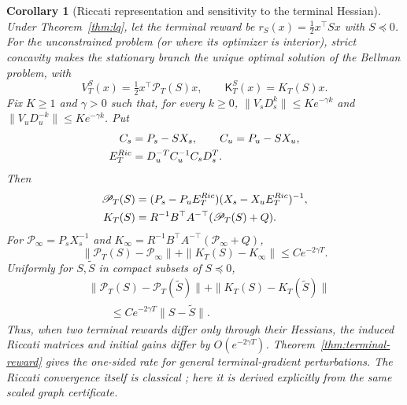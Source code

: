 \documentclass[twocolumn,nameyear,amsthm]{autart}
\newcommand{\Kfb}{\mathsf K}
\numberwithin{equation}{section}
\newtheorem{corollary}[theorem]{Corollary}
\begin{document}
\begin{corollary}[Riccati representation and sensitivity to the terminal Hessian]
\label{cor:riccati-rate}
Under Theorem~\ref{thm:lq}, let the terminal reward be
$r_S(x)=\tfrac12x^\top Sx$ with $S\preceq0$.  For the unconstrained problem
(or where its optimizer is interior), strict concavity makes the stationary
branch the unique optimal solution of the Bellman problem, with
\[
 V_T^S(x)=\tfrac12x^\top\mathscr P_T(S)x,\qquad
 \Kfb_T^S(x)=K_T(S)x.
\]
Fix $K\ge1$ and $\gamma>0$ such that, for every $k\ge0$,
$\|V_sD_s^k\|\le Ke^{-\gamma k}$ and
$\|V_uD_u^{-k}\|\le Ke^{-\gamma k}$.
Put
\begin{equation}\label{eq:lq-mobius-data}
 \begin{aligned}
 C_s&=P_s-SX_s,\qquad C_u=P_u-SX_u,\\
 E_T^{\rm Ric}&=D_u^{-T}C_u^{-1}C_sD_s^T .
 \end{aligned}
\end{equation}
Then
\begin{align}
 \mathscr P_T(S)&=(P_s-P_uE_T^{\rm Ric})(X_s-X_uE_T^{\rm Ric})^{-1},
 \label{eq:lq-mobius}\\
 K_T(S)&=R^{-1}B^\top A^{-\top}(\mathscr P_T(S)+Q).
 \label{eq:lq-first-gain}
\end{align}
For $\mathscr P_\infty=P_sX_s^{-1}$ and
$K_\infty=R^{-1}B^\top A^{-\top}(\mathscr P_\infty+Q)$,
\begin{equation}\label{eq:lq-doubled-rate}
 \|\mathscr P_T(S)-\mathscr P_\infty\|+
 \|K_T(S)-K_\infty\|\le Ce^{-2\gamma T}.
\end{equation}
Uniformly for $S,\widetilde S$ in compact subsets of $S\preceq0$,
\begin{align}
 &\|\mathscr P_T(S)-\mathscr P_T(\widetilde S)\|
 +\|K_T(S)-K_T(\widetilde S)\|\nonumber\\
 &\qquad\le Ce^{-2\gamma T}\|S-\widetilde S\|.
 \label{eq:lq-terminal-hessian-forgetting}
\end{align}
Thus, when two terminal rewards differ only through their Hessians, the
induced Riccati matrices and initial gains differ by $O(e^{-2\gamma T})$.
Theorem~\ref{thm:terminal-reward} gives the one-sided rate for general
terminal-gradient perturbations.  The Riccati convergence itself is classical
\citep{caines1970discrete}; here it is derived explicitly from the same scaled
graph certificate.
\end{corollary}
\end{document}
